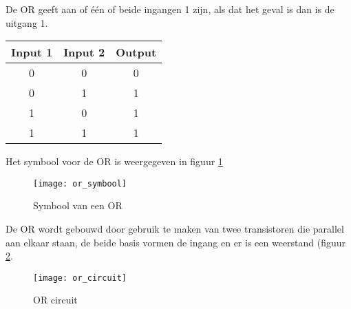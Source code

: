 De OR geeft aan of \'e\'en of beide ingangen 1 zijn, als dat het geval is dan is de uitgang 1.

\begin{tabular}{ |c|c|c| }
\hline
\rowcolor{gray!60}
	Input 1 & Input 2 & Output \\
	\hline
	0 & 0 & 0 \\
	\hline
	0 & 1 & 1 \\
	\hline
	1 & 0 & 1 \\
	\hline
	1 & 1 & 1 \\
	\hline
\end{tabular}

Het symbool voor de OR is weergegeven in figuur \ref{symbool:or}

\begin{figure}[h]
\texttt{[image: or\_symbool]}
\centering
\caption{Symbool van een OR}
\label{symbool:or}
\end{figure}

De OR wordt gebouwd door gebruik te maken van twee transistoren die parallel aan elkaar staan, de beide basis vormen de ingang en er is een weerstand (figuur \ref{circuit:or}.

\begin{figure}[h]
\texttt{[image: or\_circuit]}
\centering
\caption{OR circuit}
\label{circuit:or}
\end{figure}

